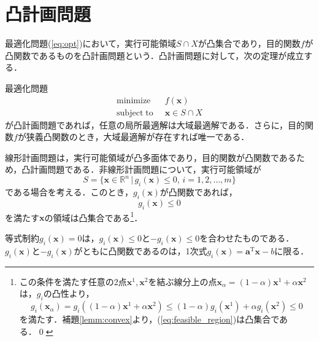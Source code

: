 \documentclass{jsreport}
\begin{document}
\section{凸計画問題}\label{sec:convex_prob}
最適化問題(\ref{eq:opt})において，実行可能領域$S \cap X$が凸集合であり，目的関数$f$が凸関数であるものを凸計画問題という．凸計画問題に対して，次の定理が成立する．
\begin{theo}\label{theo:convex_problem}
  最適化問題
  \begin{align}
    \mathrm{minimize} \; \; &f(\bm{x}) \nonumber\\
    \mathrm{subject \; to} \; \; &\bm{x} \in S \cap X \nonumber
  \end{align}
  が凸計画問題であれば，任意の局所最適解は大域最適解である．さらに，目的関数$f$が狭義凸関数のとき，大域最適解が存在すれば唯一である．
\end{theo}

線形計画問題は，実行可能領域が凸多面体であり，目的関数が凸関数であるため，凸計画問題である．非線形計画問題について，実行可能領域が
\begin{equation}\label{eq:feasible_region}
  S = \{\bm{x} \in \mathbb{R}^n \, | \, g_i(\bm{x}) \leq 0, \, i = 1, 2, \ldots, m\}
\end{equation}
である場合を考える．このとき，$g_i(\bm{x})$が凸関数であれば，
\begin{equation}
  g_i(\bm{x}) \leq 0 \nonumber
\end{equation}
を満たす$\bm{x}$の領域は凸集合である\footnote{この条件を満たす任意の2点$\bm{x}^1, \bm{x}^2$を結ぶ線分上の点$\bm{x}_{\alpha} = (1 - \alpha)\bm{x}^1 + \alpha \bm{x}^2$
は，$g_i$の凸性より，
\begin{equation}
  g_i(\bm{x}_{\alpha}) = g_i((1 - \alpha)\bm{x}^1 + \alpha \bm{x}^2) \leq (1 - \alpha)g_i(\bm{x}^1) + \alpha g_i(\bm{x}^2) \leq 0 \nonumber
\end{equation}
を満たす．補題\ref{lemm:convex}より，(\ref{eq:feasible_region})は凸集合である．\qed
}．

等式制約$g_i(\bm{x}) = 0$は，$g_i(\bm{x}) \leq 0$と$-g_i(\bm{x}) \leq 0$を合わせたものである．$g_i(\bm{x})$と$-g_i(\bm{x})$がともに凸関数であるのは，1次式$g_i(\bm{x}) = \bm{a}^{\mathrm{T}}\bm{x} - b$に限る．
\end{document}
